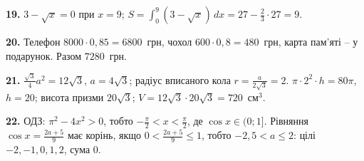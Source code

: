 \documentclass[12pt]{article}
\begin{document}
\par\noindent\textbf{19.} $3-\sqrt x=0$ при $x=9$; $S=\int_0^9(3-\sqrt x)\,dx=27-\frac23\cdot27=9$.\par\nopagebreak

\par\noindent\textbf{20.} Телефон $8000\cdot0{,}85=6800$~грн, чохол $600\cdot0{,}8=480$~грн, карта пам'яті -- у подарунок. Разом $7280$~грн.\par\nopagebreak

\par\noindent\textbf{21.} $\frac{\sqrt3}{4}a^2=12\sqrt3$, $a=4\sqrt3$; радіус вписаного кола $r=\frac{a}{2\sqrt3}=2$. $\pi\cdot2^2\cdot h=80\pi$, $h=20$; висота призми $20\sqrt3$; $V=12\sqrt3\cdot20\sqrt3=720$~см$^3$.\par\nopagebreak

\par\noindent\textbf{22.} ОДЗ: $\pi^2-4x^2>0$, тобто $-\frac\pi2<x<\frac\pi2$, де $\cos x\in(0;1]$. Рівняння $\cos x=\frac{2a+5}{9}$ має корінь, якщо $0<\frac{2a+5}{9}\leqslant1$, тобто $-2{,}5<a\leqslant2$: цілі $-2,-1,0,1,2$, сума $0$.\par\nopagebreak
\end{document}
